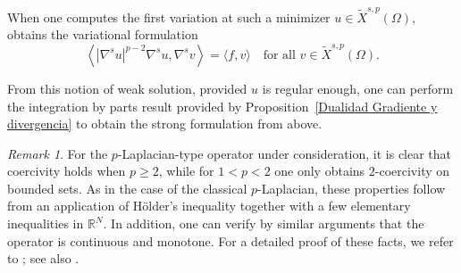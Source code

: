 \documentclass[]{amsart}
\theoremstyle{definition}
\theoremstyle{definition}
\theoremstyle{remark}
\newtheorem{remark}[theorem]{Remark}
\numberwithin{equation}{section}
\begin{document}
When one computes the first variation at such a minimizer $u \in \widetilde{X}^{s, p}(\Omega)$, obtains the variational formulation
\begin{equation} \label{eq:weak-formulation}
\left\langle \left| \nabla^s u \right|^{p-2} \nabla^s u, \nabla^s v \right\rangle = \langle f, v \rangle \quad \text{for all } v \in \widetilde{X}^{s, p}(\Omega).    
\end{equation}

From this notion of weak solution, provided $u$ is regular enough, one can perform the integration by parts result provided by Proposition~\ref{Dualidad Gradiente y divergencia} to obtain the strong formulation from above.
 



\begin{remark}
	\label{rem: coercividad}
For the $p$-Laplacian-type operator under consideration, it is clear that coercivity holds when \( p \geq 2 \), while for \( 1<p<2 \) one only obtains $2$-coercivity on bounded sets. As in the case of the classical $p$-Laplacian,
these properties follow from an application of Hölder's inequality together with a few elementary inequalities in \( \mathbb{R}^N \). 
In addition, one can verify by similar arguments that the operator is continuous and monotone.  For a detailed proof of these facts,
we refer to \cite[Section~5.1]{glowinski1975approximation}; see also \cite[Example 3]{savare1998regularity}.
\end{remark}
\end{document}

